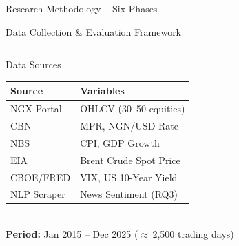 \documentclass[aspectratio=169,11pt]{beamer}
\begin{document}
\begin{frame}{Research Methodology -- Six Phases}
\begin{center}
		\end{center}
	\end{frame}
	
	\begin{frame}{Data Collection \& Evaluation Framework}
		\vspace{-14pt}
		\begin{columns}[T]
			\vspace{-2pt}
			\begin{block}{Data Sources}
				{\scriptsize
					\begin{tabular}{ll}
						\toprule
						\textbf{Source} & \textbf{Variables}\\
						\midrule
						NGX Portal      & OHLCV (30--50 equities)\\
						CBN             & MPR, NGN/USD Rate\\
						NBS             & CPI, GDP Growth\\
						EIA             & Brent Crude Spot Price\\
						CBOE/FRED       & VIX, US 10-Year Yield\\
						NLP Scraper     & News Sentiment (RQ3)\\
						\bottomrule
					\end{tabular}\\[3pt]
					\textbf{Period:} Jan 2015 -- Dec 2025
					($\approx$\,2,500 trading days)}
			\end{block}
			

\end{columns}
\end{frame}
\end{document}
